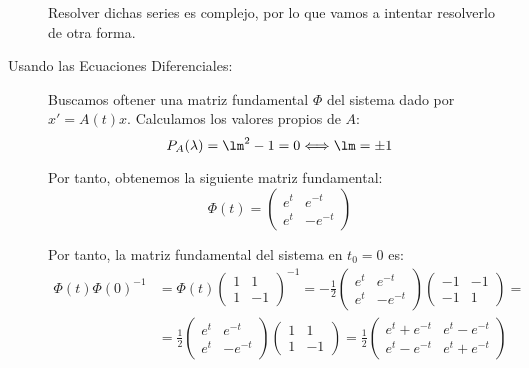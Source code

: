 \documentclass[12pt]{article}
\begin{document}
\begin{ejercicio}
\begin{description}
            Resolver dichas series es complejo, por lo que vamos a intentar resolverlo de otra forma.

            \item[Usando las Ecuaciones Diferenciales:]
            Buscamos oftener una matriz fundamental $\Phi$ del sistema dado por $x'=A(t)x$. Calculamos los valores propios de $A$:
            \begin{equation*}
                P_A(\lambda) = \lm^2-1 = 0 \Longleftrightarrow \lm = \pm 1
            \end{equation*}

            Por tanto, obtenemos la siguiente matriz fundamental:
            \begin{equation*}
                \Phi(t)=\begin{pmatrix}
                    e^t & e^{-t} \\
                    e^t & -e^{-t}
                \end{pmatrix}
            \end{equation*}

            Por tanto, la matriz fundamental del sistema en $t_0=0$ es:
            \begin{align*}
                \Phi(t)\Phi(0)^{-1}
                &= \Phi(t)\begin{pmatrix}
                    1 & 1 \\
                    1 & -1
                \end{pmatrix}^{-1}
                = -\frac{1}{2}\begin{pmatrix}
                    e^t & e^{-t} \\
                    e^t & -e^{-t}
                \end{pmatrix}
                \begin{pmatrix}
                    -1 & -1 \\
                    -1 & 1
                \end{pmatrix}
                =\\&= \frac{1}{2}\begin{pmatrix}
                    e^t & e^{-t} \\
                    e^t & -e^{-t}
                \end{pmatrix}
                \begin{pmatrix}
                    1 & 1 \\
                    1 & -1
                \end{pmatrix}
                =\frac{1}{2}\begin{pmatrix}
                    e^t+e^{-t} & e^t - e^{-t} \\
                    e^t-e^{-t} & e^t+e^{-t}
                \end{pmatrix}
            \end{align*}
        \end{description}


\end{ejercicio}
\end{document}
